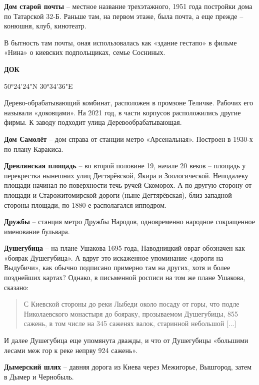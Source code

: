 \medskip

\textbf{Дом старой почты} – местное название трехэтажного, 1951 года постройки дома по Татарской 32-Б. Раньше там, на первом этаже, была почта, а еще прежде – конюшня, клуб, кинотеатр.

В бытность там почты, оная использовалась как «здание гестапо» в фильме «Нина» о киевских подпольщиках, семье Сосниных.\\

\medskip

\textbf{ДОК}

50°24'24"N 30°34'36"E

Дерево-обрабатывающий комбинат, расположен в промзоне Теличке. Рабочих его называли «доковцами». На 2021 год, в части корпусов расположились другие фирмы. К заводу подходит улица Деревообрабатывающая.\\

\medskip

\textbf{Дом Самолёт} – дом справа от станции метро «Арсенальная». Построен в 1930-х по плану Каракиса.\\

\medskip

\textbf{Древлянская площадь} – во второй половине 19, начале 20 веков – площадь у перекрестка нынешних улиц Дегтярёвской, Якира и Зоологической. Неподалеку площади начинал по поверхности течь ручей Скоморох. А по другую сторону от площади и Старожитомирской дороги (ныне Дегтярёвская), близ западной стороны площади, по 1880-е располагался ипподром.\\

\medskip

\textbf{Дружбы} – станция метро Дружбы Народов, одновременно народное сокращенное именование бульвара.\\

\medskip

\textbf{Душегубица} – на плане Ушакова 1695 года, Наводницкий овраг обозначен как «боярак Душегубица». А вдруг это искаженное упоминание «дороги на Выдубичи», как обычно подписано примерно там на других, хотя и более позднейших картах? Однако, в письменной росписи на том же плане Ушакова, сказано:

\begin{quotation}
С Киевской стороны до реки Лыбеди около посаду от горы, что подле Николаевского монастыря до бояраку, прозываемом Душегубицы, 855 сажень, в том числе на 345 саженях валок, старинной небольшой [...]\end{quotation}

И далее Душегубица еще упомянута дважды, и что от Душегубицы «большими лесами меж гор к реке непрву 924 сажень».\\

\medskip

\textbf{Дымерский шлях} – давняя дорога из Киева через Межигорье, Вышгород, затем в Дымер и Чернобыль.

